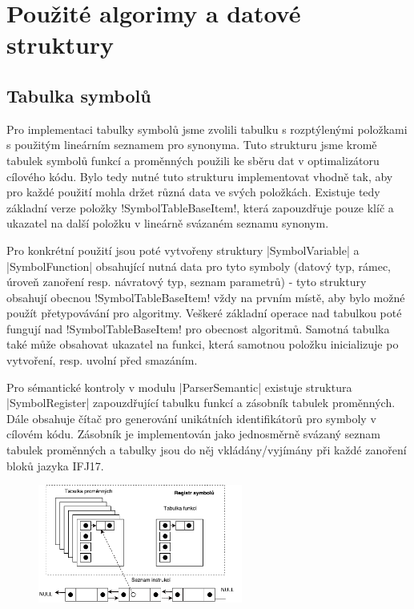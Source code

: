 \section{Použité algorimy a datové struktury}

\subsection{Tabulka symbolů}
Pro implementaci tabulky symbolů jsme zvolili tabulku s rozptýlenými položkami s použitým lineárním seznamem pro synonyma.
Tuto strukturu jsme kromě tabulek symbolů funkcí a proměnných použili ke sběru dat v optimalizátoru cílového kódu. Bylo tedy nutné tuto strukturu implementovat vhodně tak, aby pro každé použití mohla držet různá data ve svých položkách. Existuje tedy základní verze položky \ic!SymbolTableBaseItem!, která zapouzdřuje pouze klíč a ukazatel na další položku v lineárně svázaném seznamu synonym.

Pro konkrétní použití jsou poté vytvořeny struktury \ic|SymbolVariable| a \ic|SymbolFunction| obsahující nutná data pro tyto symboly (datový typ, rámec, úroveň zanoření resp. návratový typ, seznam parametrů) - tyto struktury obsahují obecnou \ic!SymbolTableBaseItem! vždy na prvním místě, aby bylo možné použít přetypovávání pro algoritmy. Veškeré základní operace nad tabulkou poté fungují nad \ic!SymbolTableBaseItem! pro obecnost algoritmů. Samotná tabulka také může obsahovat ukazatel na funkci, která samotnou položku inicializuje po vytvoření, resp. uvolní před smazáním.

Pro sémantické kontroly v modulu \ic|ParserSemantic| existuje struktura \ic|SymbolRegister| zapouzdřující tabulku funkcí a zásobník tabulek proměnných. Dále obsahuje čítač pro generování unikátních identifikátorů pro symboly v cílovém kódu. Zásobník je implementován jako jednosměrně svázaný seznam tabulek proměnných a tabulky jsou do něj vkládány/vyjímány při každé zanoření bloků jazyka IFJ17.

\begin{figure}[htbp]
    \centering
    \includegraphics[width=0.6\textwidth, angle=0]{src/assets/symbol_table.pdf}
\end{figure}

